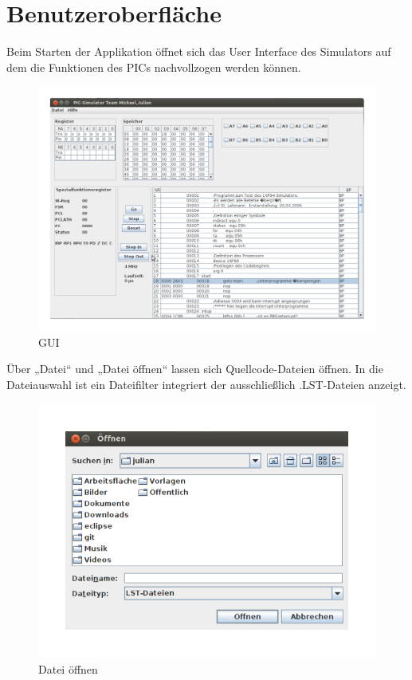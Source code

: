 \section{Benutzeroberfl\"ache}

Beim Starten der Applikation \"offnet sich das User Interface des Simulators auf dem die Funktionen des PICs nachvollzogen werden k\"onnen.

\begin{figure}[h]
\centering
\includegraphics[scale=0.4]{Bilder/GUI.pdf}
\caption{GUI}
\end{figure}
\newpage

\noindent \"Uber „Datei“ und „Datei \"offnen“ lassen sich Quellcode-Dateien \"offnen. In die Dateiauswahl ist ein Dateifilter integriert der ausschließlich .LST-Dateien anzeigt.

\begin{figure}[h]
\centering
\includegraphics[scale=0.7]{Bilder/Offnen.pdf}
\caption{Datei \"offnen}
\end{figure}

